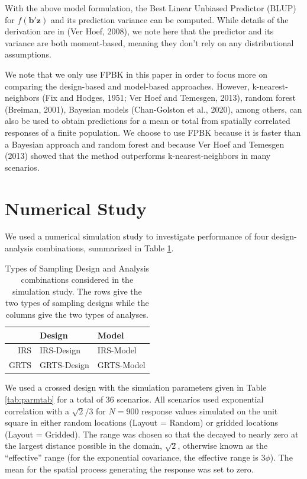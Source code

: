 \documentclass[]{elsarticle} %
\begin{document}
With the above model formulation, the Best Linear Unbiased Predictor
(BLUP) for \(f(\mathbf{b}'\mathbf{z})\) and its prediction variance can
be computed. While details of the derivation are in (Ver Hoef, 2008), we
note here that the predictor and its variance are both moment-based,
meaning they don't rely on any distributional assumptions.

We note that we only use FPBK in this paper in order to focus more on
comparing the design-based and model-based approaches. However,
k-nearest-neighbors (Fix and Hodges, 1951; Ver Hoef and Temesgen, 2013),
random forest (Breiman, 2001), Bayesian models (Chan-Golston et al.,
2020), among others, can also be used to obtain predictions for a mean
or total from spatially correlated responses of a finite population. We
choose to use FPBK because it is faster than a Bayesian approach and
random forest and because Ver Hoef and Temesgen (2013) showed that the
method outperforms k-nearest-neighbors in many scenarios.

\hypertarget{sec:numstudy}{%
\section{Numerical Study}\label{sec:numstudy}}

We used a numerical simulation study to investigate performance of four
design-analysis combinations, summarized in Table
\ref{tab:designanalysis}.

\begin{table}[ht]
\centering
\begin{tabular}{r|ll}
  \hline
 & Design & Model \\ 
  \hline
IRS & IRS-Design & IRS-Model \\ 
  GRTS & GRTS-Design & GRTS-Model \\ 
   \hline
\end{tabular}
\caption{\label{tab:designanalysis} Types of Sampling Design and Analysis combinations considered in the simulation study. The rows give the two types of sampling designs while the columns give the two types of analyses.} 
\end{table}

We used a crossed design with the simulation parameters given in Table
\ref{tab:parmtab} for a total of 36 scenarios. All scenarios used
exponential correlation with a \(\sqrt{2} / 3\) for \(N = 900\) response
values simulated on the unit square in either random locations (Layout =
Random) or gridded locations (Layout = Gridded). The range was chosen so
that the decayed to nearly zero at the largest distance possible in the
domain, \(\sqrt{2}\), otherwise known as the ``effective'' range (for
the exponential covariance, the effective range is \(3\phi\)). The mean
for the spatial process generating the response was set to zero.
\end{document}
